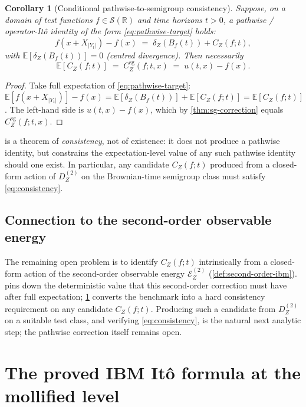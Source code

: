 \documentclass[11pt,reqno]{amsart}
\theoremstyle{plain}
\newtheorem{corollary}[theorem]{Corollary}
\theoremstyle{definition}
\theoremstyle{remark}
\newcommand{\R}{\mathbb{R}}
\newcommand{\E}{\mathbb{E}}
\newcommand{\Energy}{\mathcal{E}}
\newcommand{\IBM}{Z}
\begin{document}
\begin{corollary}[Conditional pathwise-to-semigroup consistency]
\label{cor:pathwise-to-sg}
Suppose, on a domain of test functions $f\in\mathscr S(\R)$ and time
horizons $t>0$, a pathwise / operator-It\^o identity
of the form \eqref{eq:pathwise-target} holds:
\[
  f(x+X_{|Y_t|})-f(x)\;=\;\delta_\IBM(B_f(t))+C_\IBM(f;t),
\]
with $\E[\delta_\IBM(B_f(t))]=0$ (centred divergence). Then necessarily
\begin{equation}\label{eq:consistency}
  \E[C_\IBM(f;t)]\;=\;C_\IBM^{\mathrm{sg}}(f;t,x)\;=\;u(t,x)-f(x).
\end{equation}
\end{corollary}

\begin{proof}
Take full expectation of \eqref{eq:pathwise-target}:
$\E[f(x+X_{|Y_t|})]-f(x)=\E[\delta_\IBM(B_f(t))]+\E[C_\IBM(f;t)]
=\E[C_\IBM(f;t)]$. The left-hand side is $u(t,x)-f(x)$, which by
\cref{thm:sg-correction} equals $C_\IBM^{\mathrm{sg}}(f;t,x)$.
\end{proof}

 is a theorem of \emph{consistency}, not of
existence: it does not produce a pathwise identity, but constrains the
expectation-level value of any such pathwise identity should one
exist. In particular, any candidate $C_\IBM(f;t)$ produced from a
closed-form action of $D_\IBM^{(2)}$ on the Brownian-time semigroup
class must satisfy \eqref{eq:consistency}.

\subsection*{Connection to the second-order observable energy}

The remaining open problem is to identify $C_\IBM(f;t)$ intrinsically
from a closed-form action of the second-order observable energy
$\Energy_\IBM^{(2)}$ (\cref{def:second-order-ibm}).
 pins down the deterministic value that this
second-order correction must have after full expectation;
\cref{cor:pathwise-to-sg} converts the benchmark into a hard
consistency requirement on any candidate $C_\IBM(f;t)$. Producing
such a candidate from $D_\IBM^{(2)}$ on a suitable test class, and
verifying \eqref{eq:consistency}, is the natural next analytic step;
the pathwise correction itself remains open.

\section{The proved IBM It\^o formula at the mollified level}\label{sec:moll-pathwise}
\end{document}
